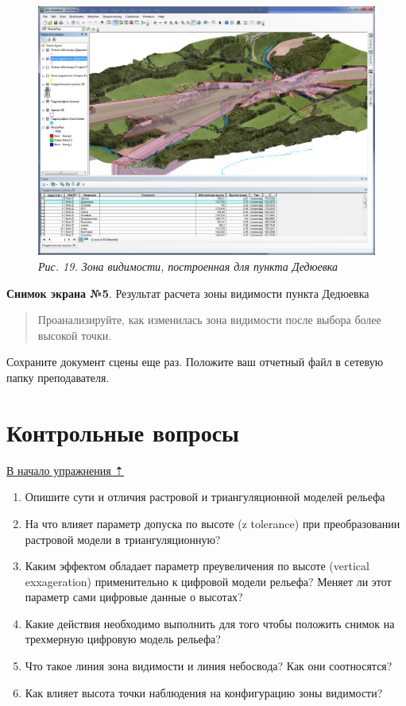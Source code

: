 \documentclass[12pt,]{book}
\begin{document}
\begin{enumerate}
  \begin{figure}
  \centering
  \includegraphics{images/Ex18/image21.png}
  \caption{\emph{Рис. 19. Зона видимости, построенная для пункта Дедюевка}}
  \end{figure}

  \textbf{Снимок экрана №5}. Результат расчета зоны видимости пункта Дедюевка

  \begin{quote}
  Проанализируйте, как изменилась зона видимости после выбора более высокой точки.
  \end{quote}
\end{enumerate}

Сохраните документ сцены еще раз. Положите ваш отчетный файл в сетевую папку преподавателя.

\hypertarget{threed-modelling-questions}{%
\section{Контрольные вопросы}\label{threed-modelling-questions}}

\protect\hyperlink{threed-modelling}{В начало упражнения ⇡}

\begin{enumerate}
\def\labelenumi{\arabic{enumi}.}
\item
  Опишите сути и отличия растровой и триангуляционной моделей рельефа
\item
  На что влияет параметр допуска по высоте (z tolerance) при преобразовании растровой модели в триангуляционную?
\item
  Каким эффектом обладает параметр преувеличения по высоте (vertical exxageration) применительно к цифровой модели рельефа? Меняет ли этот параметр сами цифровые данные о высотах?
\item
  Какие действия необходимо выполнить для того чтобы положить снимок на трехмерную цифровую модель рельефа?
\item
  Что такое линия зона видимости и линия небосвода? Как они соотносятся?
\item
  Как влияет высота точки наблюдения на конфигурацию зоны видимости?
\end{enumerate}
\end{document}
